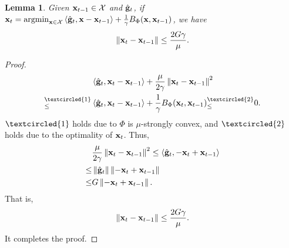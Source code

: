 \documentclass[journal]{IEEEtran}
\newtheorem{Lemma}{\bf{Lemma}}
\begin{document}
\begin{Lemma}
\label{lemma_distance_between_x_oa}
Given ${\bf x}_{t-1}\in{\mathcal{X}}$ and $\hat{{\bf g}}_t$, if $\x_t = \argmin_{\x \in \Xcal} \lrangle{\hat{\g}_t, \x - \x_{t-1}} + \frac{1}{\gamma}B_{\Phi}(\x, \x_{t-1})$, we have
\begin{align}
\nonumber
\left\lVert{\bf x}_t - {\bf x}_{t-1}\right\rVert \le \frac{2 G \gamma}{\mu}.
\end{align}
\end{Lemma}
\begin{proof}

\begin{align}
\nonumber
& \lrangle{\hat{\g}_t, \x_t - \x_{t-1}} + \frac{\mu}{2\gamma} \lrnorm{\x_t - \x_{t-1}}^2 \\ \nonumber
\refabovecir{\le}{\textcircled{1}} & \lrangle{\hat{\g}_t, \x_t - \x_{t-1}} + \frac{1}{\gamma} B_{\Phi}(\x_t, \x_{t-1}) \refabovecir{\le}{\textcircled{2}}  0.
\end{align} $\textcircled{1}$ holds due to $\Phi$ is $\mu$-strongly convex, and $\textcircled{2}$ holds due to the optimality of ${\bf x}_t$. Thus, 
\begin{align}
\nonumber
& \frac{\mu}{2\gamma} \left\lVert{\bf x}_t - {\bf x}_{t-1}\right\rVert^2 \le \left\langle\hat{{\bf g}}_t, -{\bf x}_t + {\bf x}_{t-1} \right\rangle \\ \nonumber
\le & \left\lVert\hat{{\bf g}}_t\right\rVert \left\lVert -{\bf x}_t + {\bf x}_{t-1}\right\rVert \\ \nonumber
\le & G \left\lVert -{\bf x}_t + {\bf x}_{t-1}\right\rVert.
\end{align} That is, 
\begin{align}
\nonumber
\left\lVert{\bf x}_t - {\bf x}_{t-1}\right\rVert \le \frac{2 G \gamma}{\mu}.
\end{align}
It completes the proof.
\end{proof}
\end{document}
